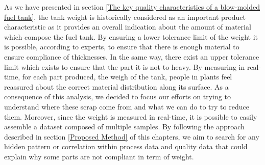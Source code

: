 As we have presented in section \ref{The key quality characteristics of a blow-molded fuel tank}, the tank weight is historically considered as an important product characteristic as it provides an overall indication about the amount of material which compose the fuel tank. By ensuring a lower tolerance limit of the weight it is possible, according to experts, to ensure that there is enough material to ensure compliance of thicknesses. In the same way, there exist an upper tolerance limit which exists to ensure that the part it is not to heavy. By measuring in real-time, for each part produced, the weigh of the tank, people in plants feel reassured about the correct material distribution along its surface.  
As a consequence of this analysis, we decided to focus our efforts on trying to understand where these scrap come from and what we can do to try to reduce them. Moreover, since the weight is measured in real-time, it is possible to easily assemble a dataset composed of multiple samples. By following the approach described in section \ref{Proposed Method} of this chapters, we aim to search for any hidden pattern or correlation within process data and quality data that could explain why some parts are not compliant in term of weight.



